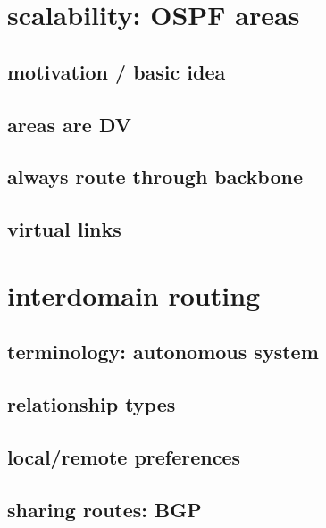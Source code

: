 \section{scalability: OSPF areas} %

\subsection{motivation / basic idea}



\subsection{areas are DV}



\subsection{always route through backbone}


\subsection{virtual links}


\section{interdomain routing}


\subsection{terminology: autonomous system}


\subsection{relationship types}


\subsection{local/remote preferences}


\subsection{sharing routes: BGP}



